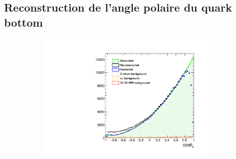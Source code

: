 
\subsection*{Reconstruction de l'angle polaire du quark bottom}

\begin{figure}
	\centering
	\begin{subfigure}{0.5\textwidth}
		\includegraphics[width=0.95\textwidth]{ILD/plots/basymmetry-final-left.pdf}
\end{subfigure}
\end{figure}
